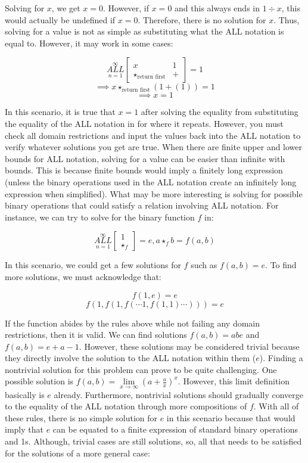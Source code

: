 \documentclass{article}
\begin{document}
Solving for $x$, we get $x=0$. However, if $x=0$ and this always ends in $1 \div x$, this would actually be undefined if $x=0$. Therefore, there is no solution for $x$. Thus, solving for a value is not as simple as substituting what the ALL notation is equal to. However, it may work in some cases:

$$\underset{n=1}{\overset{\infty}{ALL}} \begin{bmatrix}
x & 1 \\
\star_{ \text{return first}} & +
\end{bmatrix} = 1$$
$$\implies x \star_{\text{return first}} (1+(1)) = 1$$
$$\implies x = 1$$

In this scenario, it is true that $x=1$ after solving the equality from substituting the equality of the ALL notation in for where it repeats. However, you must check all domain restrictions and input the values back into the ALL notation to verify whatever solutions you get are true. When there are finite upper and lower bounds for ALL notation, solving for a value can be easier than infinite with bounds. This is because finite bounds would imply a finitely long expression (unless the binary operations used in the ALL notation create an infinitely long expression when simplified). What may be more interesting is solving for possible binary operations that could satisfy a relation involving ALL notation. For instance, we can try to solve for the binary function $f$ in:

$$\underset{n=1}{\overset{\infty}{ALL}} \begin{bmatrix}
1 \\
\star_f
\end{bmatrix} = e, a \star_f b = f(a,b)$$

In this scenario, we could get a few solutions for $f$ such as $f(a,b)=e$. To find more solutions, we must acknowledge that:

$$f(1,e)=e$$
$$f(1,f(1,f(\cdots 1,f(1,1) \cdots ))) = e$$

If the function abides by the rules above while not failing any domain restrictions, then it is valid. We can find solutions $f(a,b)=abe$ and $f(a,b)=e+a-1$. However, these solutions may be considered trivial because they directly involve the solution to the ALL notation within them ($e$). Finding a nontrivial solution for this problem can prove to be quite challenging. One possible solution is $f(a,b)=\underset{x \rightarrow \infty}{\lim} (a+\frac{a}{x})^x$. However, this limit definition basically is $e$ already. Furthermore, nontrivial solutions should gradually converge to the equality of the ALL notation through more compositions of $f$. With all of these rules, there is no simple solution for $e$ in this scenario because that would imply that $e$ can be equated to a finite expression of standard binary operations and 1s. Although, trivial cases are still solutions, so, all that needs to be satisfied for the solutions of a more general case:
\end{document}
